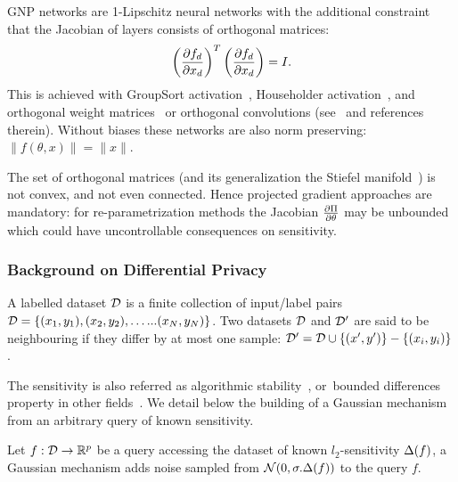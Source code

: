     \begin{definition}\label{def:gnp}
        GNP networks are 1-Lipschitz neural networks with the additional constraint that the Jacobian of layers consists of orthogonal matrices:
            \begin{equation}
                \left(\Jac{f_d}{x_d}\right)^T\left(\Jac{f_d}{x_d}\right)=I.%
            \end{equation}
        This is achieved with GroupSort activation~\cite{anil2019sorting,tanielian2021approximating}, Householder activation~\cite{mhammedi2017efficient}, and orthogonal weight matrices~\cite{li2019preventing,li2019orthogonal} or orthogonal convolutions (see~\cite{achour2022existence,singla2022improved,xu2022lot} and references therein). Without biases these networks are also norm preserving: $\|f(\theta,x)\|=\|x\|.$  
    \end{definition}

    The set of orthogonal matrices (and its generalization the Stiefel manifold~\cite{absil2008optimization}) is not convex, and not even connected. Hence projected gradient approaches are mandatory: for re-parametrization methods the Jacobian $\frac{\partial \Pi}{\partial \theta}$ may be unbounded which could have uncontrollable consequences on sensitivity.

    \subsubsection{Background on Differential Privacy}\label{app:dpdefs}

    \begin{definition}\label{def:neighbouring}
        A labelled dataset $\mathcal{D}$ is a finite collection of input/label pairs $\mathcal{D}=\{(x_1,y_1),(x_2,y_2),\ldots... (x_N,y_N)\}$. Two datasets $\mathcal{D}$ and $\mathcal{D}'$ are said to be neighbouring if they differ by at most one sample: $\mathcal{D}'=\mathcal{D}\cup \{(x',y')\}-\{(x_i,y_i)\}$.
    \end{definition}

    The sensitivity is also referred as algorithmic stability~\cite{bousquet2002stability}, or~bounded differences property in other fields~\cite{mcdiarmid1989method}. We detail below the building of a Gaussian mechanism from an arbitrary query of known sensitivity.

    \begin{definition}\label{def:gaussianmechanism}
        Let $f:\mathcal{D}\rightarrow\mathbb{R}^p$ be a query accessing the dataset of known $l_2$-sensitivity $\Delta(f)$, a Gaussian mechanism adds noise sampled from $\mathcal{N}(0,\sigma.\Delta(f))$ to the query $f$.
    \end{definition}
    
